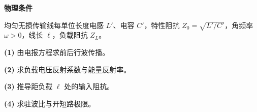 \textbf{物理条件}\par 均匀无损传输线每单位长度电感 \(L'\)、电容 \(C'\)，特性阻抗 \(Z_0=\sqrt{L'/C'}\)，角频率 \(\omega>0\)，线长 \(\ell\)，负载阻抗 \(Z_L\)。
\par\noindent\textbf{(1)} 由电报方程求前后行波传播。
\par\noindent\textbf{(2)} 求负载电压反射系数与能量反射率。
\par\noindent\textbf{(3)} 推导距负载 \(\ell\) 处的输入阻抗。
\par\noindent\textbf{(4)} 求驻波比与开短路极限。
